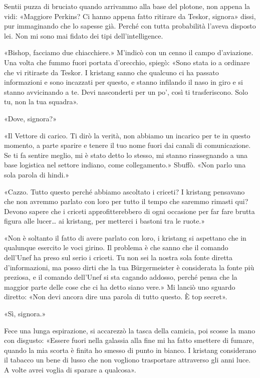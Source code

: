 \hfill\break

Sentii puzza di bruciato quando arrivammo alla base del plotone, non
appena la vidi: «Maggiore Perkins? Ci hanno appena fatto ritirare da
Teskor, signora» dissi, pur immaginando che lo sapesse già. Perché con
tutta probabilità l'aveva disposto lei. Non mi sono mai fidato dei tipi
dell'intelligence.

«Bishop, facciamo due chiacchiere.» M'indicò con un cenno il campo
d'aviazione. Una volta che fummo fuori portata d'orecchio, spiegò: «Sono
stata io a ordinare che vi ritiraste da Teskor. I kristang sanno che
qualcuno ci ha passato informazioni e sono incazzati per questo, e
stanno infilando il naso in giro e si stanno avvicinando a te. Devi
nasconderti per un po', così ti trasferiscono. Solo tu, non la tua
squadra».

«Dove, signora?»

«Il Vettore di carico. Ti dirò la verità, non abbiamo un incarico per te
in questo momento, a parte sparire e tenere il tuo nome fuori dai canali
di comunicazione. Se ti fa sentire meglio, mi è stato detto lo stesso,
mi stanno riassegnando a una base logistica nel settore indiano, come
collegamento.» Sbuffò. «Non parlo una sola parola di hindi.»

«Cazzo. Tutto questo perché abbiamo ascoltato i criceti? I kristang
pensavano che non avremmo parlato con loro per tutto il tempo che
saremmo rimasti qui? Devono sapere che i criceti approfitterebbero di
ogni occasione per far fare brutta figura alle lucer\ldots{} ai
kristang, per metterci i bastoni tra le ruote.»

«Non è soltanto il fatto di avere parlato con loro, i kristang si
aspettano che in qualunque esercito le voci girino. Il problema è che
sanno che il comando dell'Unef ha preso sul serio i criceti. Tu non sei
la nostra sola fonte diretta d'informazioni, ma posso dirti che la tua
Bürgermeister è considerata la fonte più preziosa, e il comando
dell'Unef si sta cagando addosso, perché pensa che la maggior parte
delle cose che ci ha detto siano vere.» Mi lanciò uno sguardo diretto:
«Non devi ancora dire una parola di tutto questo. È top secret».

«Sì, signora.»

Fece una lunga espirazione, si accarezzò la tasca della camicia, poi
scosse la mano con disgusto: «Essere fuori nella galassia alla fine mi
ha fatto smettere di fumare, quando la mia scorta è finita ho smesso di
punto in bianco. I kristang considerano il tabacco un bene di lusso che
non vogliono trasportare attraverso gli anni luce. A volte avrei voglia
di sparare a qualcosa».

